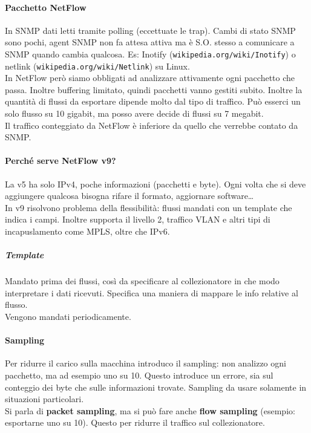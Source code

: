 \documentclass[10pt]{book}
\begin{document}
\paragraph{Pacchetto NetFlow} In SNMP dati letti tramite polling (eccettuate le trap). Cambi di stato SNMP sono pochi, agent SNMP non fa attesa attiva ma è S.O. stesso a comunicare a SNMP quando cambia qualcosa. Es: Inotify (\texttt{wikipedia.org/wiki/Inotify}) o netlink (\texttt{wikipedia.org/wiki/Netlink}) su Linux.\\
In NetFlow però siamo obbligati ad analizzare attivamente ogni pacchetto che passa. Inoltre buffering limitato, quindi pacchetti vanno gestiti subito. Inoltre la quantità di flussi da esportare dipende molto dal tipo di traffico. Può esserci un solo flusso su 10 gigabit, ma posso avere decide di flussi su 7 megabit.\\
Il traffico conteggiato da NetFlow è inferiore da quello che verrebbe contato da SNMP.
\paragraph{Perché serve NetFlow v9?} La v5 ha solo IPv4, poche informazioni (pacchetti e byte). Ogni volta che si deve aggiungere qualcosa bisogna rifare il formato, aggiornare software\ldots\\
In v9 risolvono problema della flessibilità: flussi mandati con un template che indica i campi. Inoltre supporta il livello 2, traffico VLAN e altri tipi di incapuslamento come MPLS, oltre che IPv6.
\subparagraph{Template} Mandato prima dei flussi, così da specificare al collezionatore in che modo interpretare i dati ricevuti. Specifica una maniera di mappare le info relative al flusso.\\
Vengono mandati periodicamente.
\paragraph{Sampling} Per ridurre il carico sulla macchina introduco il sampling: non analizzo ogni pacchetto, ma ad esempio uno su 10. Questo introduce un errore, sia sul conteggio dei byte che sulle informazioni trovate. Sampling da usare solamente in situazioni particolari.\\
Si parla di \textbf{packet sampling}, ma si può fare anche \textbf{flow sampling} (esempio: esportarne uno su 10). Questo per ridurre il traffico sul collezionatore.
\end{document}
